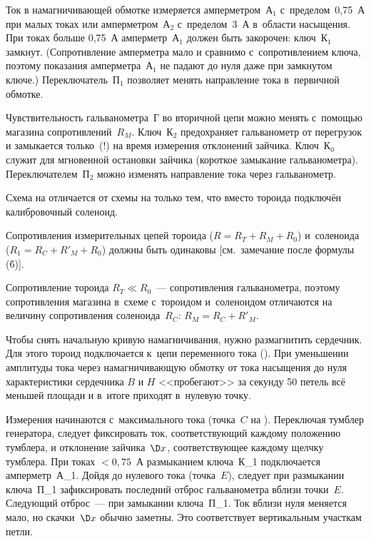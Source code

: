 
Ток в намагничивающей обмотке измеряется амперметром~А$_1$ с~пределом~0,75~А при малых токах или амперметром~А$_2$
с~пределом~3~А в~области насыщения. При токах больше 0,75~А амперметр~А$_1$ должен быть закорочен: ключ~К$_1$ замкнут.
(Сопротивление амперметра мало и сравнимо с~сопротивлением ключа, поэтому показания амперметра~А$_1$ не падают до нуля
даже при замкнутом ключе.) Переключатель~П$_1$ позволяет менять направление тока в~первичной обмотке.

Чувствительность гальванометра~Г во вторичной цепи можно менять с~помощью магазина сопротивлений~$R_M$. Ключ~К$_2$
предохраняет гальванометр от перегрузок и замыкается только~(!) на время измерения отклонений зайчика. Ключ~К$_0$ служит
для мгновенной остановки зайчика (короткое замыкание гальванометра). Переключателем~П$_2$ можно изменять направление тока
через гальванометр.

Схема на  отличается от схемы на  только тем, что вместо тороида подключён калибровочный соленоид.

Сопротивления измерительных цепей тороида ($R=R_T+ R_M + R_0$) и~соленоида ($R_1=R_C+R'_M+R_0$) должны быть одинаковы
[см.~замечание после формулы (\r{6})].


Сопротивление тороида $R_T\ll R_0$~--- сопротивления гальванометра, поэтому сопротивления магазина в~схеме с~тороидом
и~соленоидом отличаются на величину сопротивления соленоида~$R_C$: $R_M = R_C + R'_M$.


Чтобы снять начальную кривую намагничивания, нужно размагнитить сердечник. Для этого тороид подключается к~цепи
переменного тока (). При уменьшении амплитуды тока через намагничивающую обмотку от тока насыщения до нуля
характеристики сердечника $B$ и $H$ <<пробегают>> за секунду 50 петель всё меньшей площади и в~итоге приходят в~нулевую
точку.

 Измерения начинаются с~максимального тока (точка~$C$ на ). Переключая тумблер генератора,
следует фиксировать ток, соответствующий каждому положению тумблера, и отклонение зайчика~$\D x$, соответствующее
каждому щелчку тумблера. При токах $< 0,75$~А размыканием ключа~К\_1 подключается амперметр~А\_1. Дойдя до нулевого тока
(точка~$E$), следует при размыкании ключа~П\_1 зафиксировать последний отброс гальванометра вблизи точки~$E$. Следующий
отброс~--- при замыкании ключа~П\_1. Ток вблизи нуля меняется мало, но скачки~$\D x$ обычно заметны. Это соответствует
вертикальным участкам петли.

